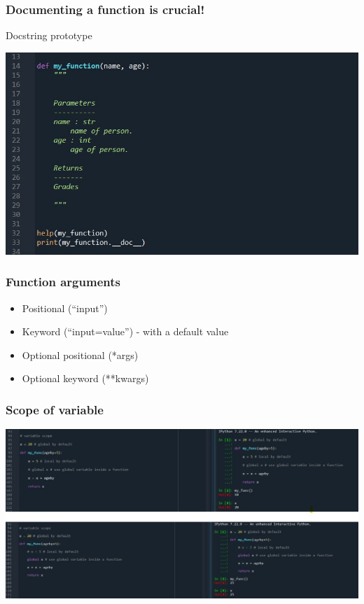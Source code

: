 \documentclass{beamer}
\begin{document}
\begin{frame}
\frametitle{Documenting a function is crucial!}
Docstring prototype
        \begin{center}
            \includegraphics[scale=0.5]{figures/documentation.jpg}
        \end{center}
\end{frame}

\begin{frame}
\frametitle{Function arguments}
    \begin{itemize}
        \item Positional (“input”) 
        \item Keyword (“input=value”) - with a default value
        \item Optional positional (*args)
        \item Optional keyword (**kwargs)        
    \end{itemize}
\end{frame}


\begin{frame}
\frametitle{Scope of variable}
    \centering
    \includegraphics[scale=0.5]{figures/variable_scope.jpg}
\end{frame}
\end{document}
